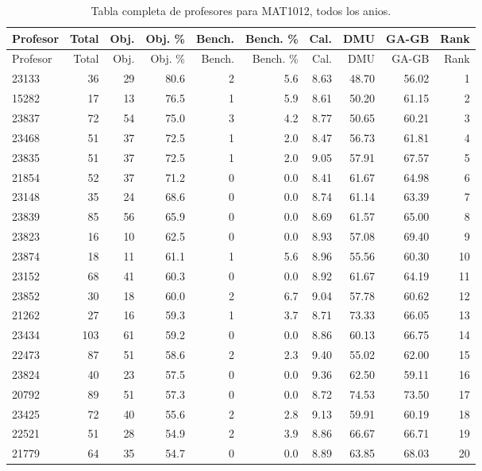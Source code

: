 \begingroup
\scriptsize
\setlength{\tabcolsep}{3pt}
\begin{longtable}{lrrrrrrrrr}
\caption{Tabla completa de profesores para MAT1012, todos los anios.}\label{tab:prof-global-mat1012-especializado}\\
\toprule
Profesor & Total & Obj. & Obj. \% & Bench. & Bench. \% & Cal. & DMU & GA-GB & Rank \\
\midrule
\endfirsthead
\toprule
Profesor & Total & Obj. & Obj. \% & Bench. & Bench. \% & Cal. & DMU & GA-GB & Rank \\
\midrule
\endhead
23133 & 36 & 29 & 80.6 & 2 & 5.6 & 8.63 & 48.70 & 56.02 & 1 \\
15282 & 17 & 13 & 76.5 & 1 & 5.9 & 8.61 & 50.20 & 61.15 & 2 \\
23837 & 72 & 54 & 75.0 & 3 & 4.2 & 8.77 & 50.65 & 60.21 & 3 \\
23468 & 51 & 37 & 72.5 & 1 & 2.0 & 8.47 & 56.73 & 61.81 & 4 \\
23835 & 51 & 37 & 72.5 & 1 & 2.0 & 9.05 & 57.91 & 67.57 & 5 \\
21854 & 52 & 37 & 71.2 & 0 & 0.0 & 8.41 & 61.67 & 64.98 & 6 \\
23148 & 35 & 24 & 68.6 & 0 & 0.0 & 8.74 & 61.14 & 63.39 & 7 \\
23839 & 85 & 56 & 65.9 & 0 & 0.0 & 8.69 & 61.57 & 65.00 & 8 \\
23823 & 16 & 10 & 62.5 & 0 & 0.0 & 8.93 & 57.08 & 69.40 & 9 \\
23874 & 18 & 11 & 61.1 & 1 & 5.6 & 8.96 & 55.56 & 60.30 & 10 \\
23152 & 68 & 41 & 60.3 & 0 & 0.0 & 8.92 & 61.67 & 64.19 & 11 \\
23852 & 30 & 18 & 60.0 & 2 & 6.7 & 9.04 & 57.78 & 60.62 & 12 \\
21262 & 27 & 16 & 59.3 & 1 & 3.7 & 8.71 & 73.33 & 66.05 & 13 \\
23434 & 103 & 61 & 59.2 & 0 & 0.0 & 8.86 & 60.13 & 66.75 & 14 \\
22473 & 87 & 51 & 58.6 & 2 & 2.3 & 9.40 & 55.02 & 62.00 & 15 \\
23824 & 40 & 23 & 57.5 & 0 & 0.0 & 9.36 & 62.50 & 59.11 & 16 \\
20792 & 89 & 51 & 57.3 & 0 & 0.0 & 8.72 & 74.53 & 73.50 & 17 \\
23425 & 72 & 40 & 55.6 & 2 & 2.8 & 9.13 & 59.91 & 60.19 & 18 \\
22521 & 51 & 28 & 54.9 & 2 & 3.9 & 8.86 & 66.67 & 66.71 & 19 \\
21779 & 64 & 35 & 54.7 & 0 & 0.0 & 8.89 & 63.85 & 68.03 & 20 \\

\end{longtable}
